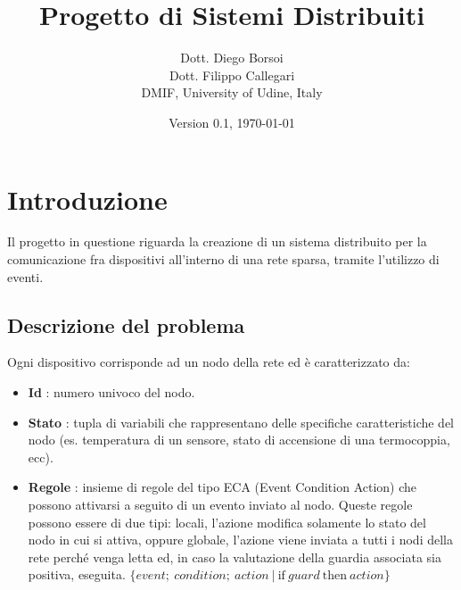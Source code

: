 \documentclass{memoir}
\title{Progetto di Sistemi Distribuiti}
\author{Dott. Diego Borsoi\\Dott. Filippo Callegari\\ DMIF, University of Udine,
	   Italy}
\date{Version 0.1, \today}
\begin{document}
\maketitle
%

\chapter{Introduzione}\label{ch:intro}

Il progetto in questione riguarda la creazione di un sistema distribuito per la comunicazione
	   fra dispositivi all'interno di una rete sparsa, tramite l'utilizzo di eventi.

\section{Descrizione del problema}

Ogni dispositivo corrisponde ad un nodo della rete ed è caratterizzato da:
\begin{itemize}
\item \textbf{Id} : numero univoco del nodo.
\item \textbf{Stato} : tupla di variabili che rappresentano delle specifiche caratteristiche
	   del nodo (es. temperatura di un sensore, stato di accensione di una termocoppia,
	   ecc).
\item \textbf{Regole} : insieme di regole del tipo ECA (Event Condition Action) che
	   possono attivarsi a seguito di un evento inviato al nodo. Queste regole possono
	   essere
	   di due tipi: locali, l'azione modifica solamente lo stato del nodo in cui si
	   attiva,
	   oppure globale, l'azione viene inviata a tutti i nodi della rete perché venga
	   letta
	   ed, in caso la valutazione della guardia associata sia positiva, eseguita.
\center$\{event;~condition;~action~|~\text{if}~guard~\text{then}~action\}$
\end{itemize}
\end{document}
